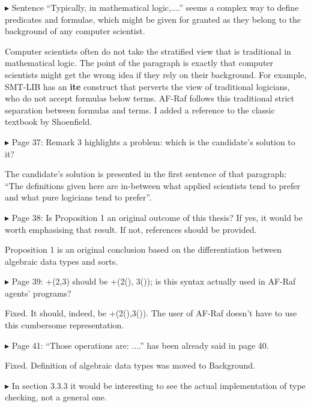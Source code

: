 \documentclass{article}
\newenvironment{them}%
  {\bigskip\noindent\begingroup\color{blue}$\blacktriangleright$\enspace}%
  {\endgroup\par}
\begin{document}
\begin{them}
Sentence ``Typically, in mathematical logic,....'' seems a complex way to define
predicates and formulae, which might be given for granted as they belong to the
background of any computer scientist.
\end{them}
Computer scientists often do not take the stratified view
  that is traditional in mathematical logic.
The point of the paragraph is exactly that computer scientists
  might get the wrong idea if they rely on their background.
For example, SMT-LIB has an {\bf ite} construct
  that perverts the view of traditional logicians,
    who do not accept formulas below terms.
AF-Raf follows this traditional strict separation between formulas and terms.
I added a reference to the classic textbook by Shoenfield.

\begin{them}
Page 37:
Remark 3 highlights a problem: which is the candidate's solution to it?
\end{them}

The candidate's solution is presented in the first sentence of that paragraph:
``The definitions given here are in-between what applied scientists tend to
prefer and what pure logicians tend to prefer''.

\begin{them}
Page 38:
Is Proposition 1 an original outcome of this thesis? If yes, it would be worth
emphasising that result. If not, references should be provided.
\end{them}
Proposition 1 is an original conclusion based on the differentiation between
algebraic data types and sorts. 

\begin{them}
Page 39:
+(2,3) should be +(2(), 3()); is this syntax actually used in AF-Raf agents'
programs?
\end{them}

Fixed. It should, indeed, be +(2(),3()). The user of AF-Raf doesn't have to use
this cumbersome representation.

\begin{them}
Page 41:
``Those operations are: ....'' has been already said in page 40.
\end{them}

Fixed. Definition of algebraic data types was moved to Background.

\begin{them}
In section 3.3.3 it would be interesting to see the actual implementation of
type checking, not a general one.
\end{them}
\end{document}
